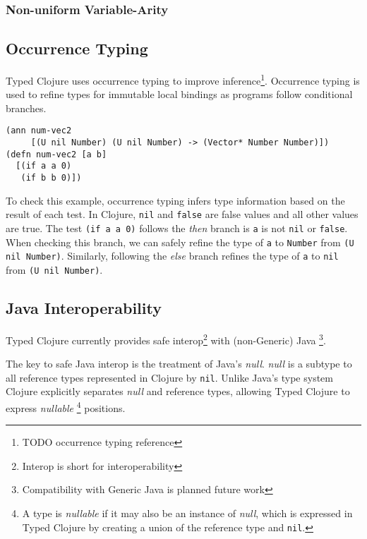 \subsubsection{Non-uniform Variable-Arity}

\subsection{Occurrence Typing}

Typed Clojure uses occurrence typing to improve inference\footnote{TODO occurrence typing reference}.
Occurrence typing is used to refine types for immutable local bindings 
as programs follow conditional branches.

\begin{lstlisting}[caption=Example of occurrence typing in Typed Clojure]
(ann num-vec2 
     [(U nil Number) (U nil Number) -> (Vector* Number Number)])
(defn num-vec2 [a b]
  [(if a a 0) 
   (if b b 0)])
\end{lstlisting}

To check this example, occurrence typing infers type information based on the result of each test.
In Clojure, \lstinline|nil| and \lstinline|false| are false values and all other values are true.
The test \lstinline|(if a a 0)| follows the \emph{then} branch is \lstinline|a| is not \lstinline|nil|
or \lstinline|false|. When checking this branch, we can safely refine the type of \lstinline|a| to \lstinline|Number| from
\lstinline|(U nil Number)|. Similarly, following the \emph{else} branch refines the type of \lstinline|a|
to \lstinline|nil| from \lstinline|(U nil Number)|.

\subsection{Java Interoperability}

Typed Clojure currently provides safe interop\footnote{Interop is short for interoperability} with (non-Generic) Java
\footnote{Compatibility with Generic Java is planned future work}.

The key to safe Java interop is the treatment of Java's \emph{null}.
\emph{null} is a subtype to all reference types
represented in Clojure by \lstinline|nil|. Unlike Java's type system
Clojure explicitly separates \emph{null} and reference types, allowing
Typed Clojure to express
\emph{nullable}
\footnote{A type is \emph{nullable} if it may also be an instance of \emph{null},
which is expressed in Typed Clojure by creating a union of the reference type and \lstinline|nil|.}
positions.

